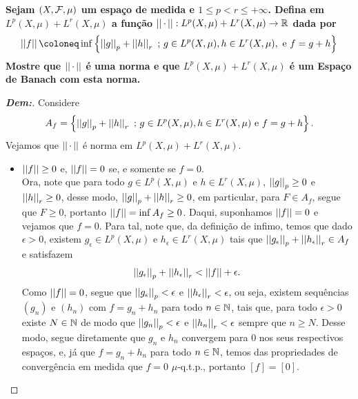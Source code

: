 \textbf{Sejam $(X, \mcal F, \mu)$ um espaço de medida e $1 \le p < r \le +\infty$. 
Defina em $L^p(X, \mu) + L^r(X, \mu)$ a função 
$\snorm {\, \cdot \,}: L^p(X, \mu) + L^r(X, \mu) \rightarrow \bR$ dada por 
\begin{align*}
  \snorm f \coloneq \inf \set{\pnorm p g + \pnorm r h \st 
  g \in L^p(X, \mu), h \in L^r (X, \mu), \text{ e } f = g+ h}
\end{align*}
Mostre que $\snorm {\, \cdot \,}$ é uma norma e 
que $L^p(X, \mu) + L^r(X, \mu)$ é um Espaço de Banach com esta norma.}
\begin{proof}[\textbf{Dem:}] Considere 
\begin{align*}
  A_f = \set{\pnorm p g + \pnorm r h \st g \in L^p(X, \mu), h \in L^r(X, \mu) 
  \text{ e } f = g + h}.
\end{align*}
  Vejamos que $\snorm{\, \cdot \,}$ 
  é norma em $L^p(X, \mu) + L^r(X, \mu)$. 
\begin{itemize}
  \item $\snorm f \ge 0$ e, $\snorm f = 0$ se, e somente se $f = 0$.\\ 
    Ora, note que para todo $g \in L^p(X,\mu)$ e $h \in L^r(X,\mu)$,
    $\pnorm p g \ge 0$ e $\pnorm r h \ge 0$, desse modo, 
    $\pnorm p g + \pnorm r h \ge 0$, em particular, para $F \in A_f$, segue que 
    $F \ge 0$, portanto $\snorm f = \inf A_f\ge 0$. Daqui, suponhamos $\snorm f = 0$
    e vejamos que $f = 0$. Para tal, note que, da definição de infimo, temos que
    dado $\epsilon > 0$,
    existem $g_\epsilon \in L^p(X, \mu)$ e $h_\epsilon \in L^r(X, \mu)$ tais que 
    $\pnorm p {g_\epsilon} + \pnorm r {h_\epsilon} \in A_f$ e satisfazem 
    \begin{align*}
      \pnorm p {g_\epsilon} + \pnorm r {h_\epsilon} < \snorm f + \epsilon.
    \end{align*}
    Como $\snorm f = 0$, segue que $\pnorm p {g_\epsilon} < \epsilon$ e 
    $\pnorm r {h_\epsilon} < \epsilon$, ou seja, existem sequências 
    $(g_n)$ e $(h_n)$ com $f = g_n + h_n$ 
    para todo $n \in \bN$, tais que, para todo $\epsilon>0$ existe $N \in \bN$
    de modo que $\pnorm p {g_n}< \epsilon$ e $\pnorm r {h_n}<\epsilon$ 
    sempre que $n \ge N$. Desse modo, segue diretamente que $g_n$ e $h_n$
    convergem para $0$ nos seus respectivos espaços, e, já que $f = g_n + h_n$
    para todo $n \in \bN$, temos das propriedades de convergência em medida 
    que $f = 0$ $\mu$-q.t.p., portanto $[f] = [0]$.
\end{itemize}
\end{proof}

